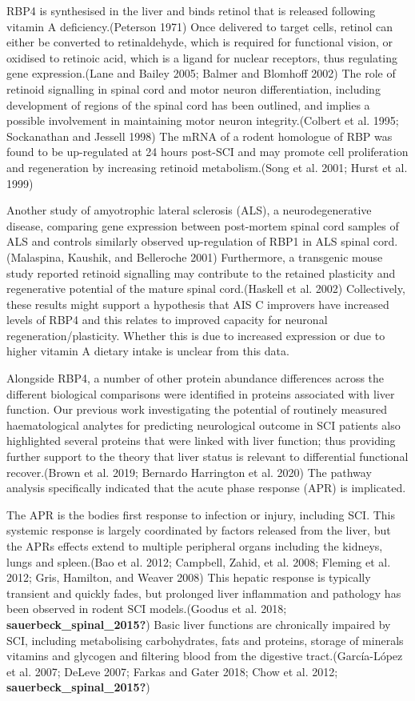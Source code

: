 \documentclass[9pt,lineno]{elife}
\begin{document}
\begin{landscape}
\begin{landscape}
RBP4 is synthesised in the liver and binds retinol that is released following vitamin A deficiency.(Peterson 1971)
Once delivered to target cells, retinol can either be converted to retinaldehyde, which is required for functional vision, or oxidised to retinoic acid, which is a ligand for nuclear receptors, thus regulating gene expression.(Lane and Bailey 2005; Balmer and Blomhoff 2002)
The role of retinoid signalling in spinal cord and motor neuron differentiation, including development of regions of the spinal cord has been outlined, and implies a possible involvement in maintaining motor neuron integrity.(Colbert et al. 1995; Sockanathan and Jessell 1998)
The mRNA of a rodent homologue of RBP was found to be up-regulated at 24 hours post-SCI and may promote cell proliferation and regeneration by increasing retinoid metabolism.(Song et al. 2001; Hurst et al. 1999)

Another study of amyotrophic lateral sclerosis (ALS), a neurodegenerative disease, comparing gene expression between post-mortem spinal cord samples of ALS and controls similarly observed up-regulation of RBP1 in ALS spinal cord.(Malaspina, Kaushik, and Belleroche 2001)
Furthermore, a transgenic mouse study reported retinoid signalling may contribute to the retained plasticity and regenerative potential of the mature spinal cord.(Haskell et al. 2002)
Collectively, these results might support a hypothesis that AIS C improvers have increased levels of RBP4 and this relates to improved capacity for neuronal regeneration/plasticity.
Whether this is due to increased expression or due to higher vitamin A dietary intake is unclear from this data.

Alongside RBP4, a number of other protein abundance differences across the different biological comparisons were identified in proteins associated with liver function.
Our previous work investigating the potential of routinely measured haematological analytes for predicting neurological outcome in SCI patients also highlighted several proteins that were linked with liver function; thus providing further support to the theory that liver status is relevant to differential functional recover.(Brown et al. 2019; Bernardo Harrington et al. 2020)
The pathway analysis specifically indicated that the acute phase response (APR) is implicated.

The APR is the bodies first response to infection or injury, including SCI.
This systemic response is largely coordinated by factors released from the liver, but the APRs effects extend to multiple peripheral organs including the kidneys, lungs and spleen.(Bao et al. 2012; Campbell, Zahid, et al. 2008; Fleming et al. 2012; Gris, Hamilton, and Weaver 2008)
This hepatic response is typically transient and quickly fades, but prolonged liver inflammation and pathology has been observed in rodent SCI models.(Goodus et al. 2018; \textbf{sauerbeck\_spinal\_2015?})
Basic liver functions are chronically impaired by SCI, including metabolising carbohydrates, fats and proteins, storage of minerals vitamins and glycogen and filtering blood from the digestive tract.(García-López et al. 2007; DeLeve 2007; Farkas and Gater 2018; Chow et al. 2012; \textbf{sauerbeck\_spinal\_2015?})


\end{landscape}
\end{landscape}
\end{document}
